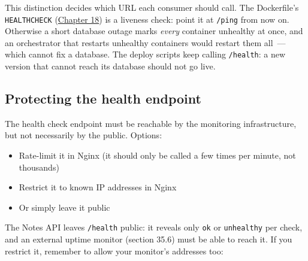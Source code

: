 \noindent{}This distinction decides which URL each consumer should call. The Dockerfile's \texttt{HEALTHCHECK} (\hyperref[ch:18-containerization]{Chapter 18}) is a liveness check: point it at \texttt{/ping} from now on. Otherwise a short database outage marks \emph{every} container unhealthy at once, and an orchestrator that restarts unhealthy containers would restart them all~--- which cannot fix a database. The deploy scripts keep calling \texttt{/health}: a new version that cannot reach its database should not go live.

\subsection*{Protecting the health endpoint}\label{35-observability:protecting-the-health-endpoint}

The health check endpoint must be reachable by the monitoring infrastructure, but not necessarily by the public. Options:

\begin{itemize}
\tightlist
\item
  Rate-limit it in Nginx (it should only be called a few times per minute, not thousands)
\item
  Restrict it to known IP addresses in Nginx
\item
  Or simply leave it public
\end{itemize}

\noindent{}The Notes API leaves \texttt{/health} public: it reveals only \texttt{ok} or \texttt{unhealthy} per check, and an external uptime monitor (section 35.6) must be able to reach it. If you restrict it, remember to allow your monitor's addresses too:

\begin{codebox}[short]

\begin{Shaded}
\begin{Highlighting}[]
\NormalTok{\}}
\end{Highlighting}
\end{Shaded}

\end{codebox}


